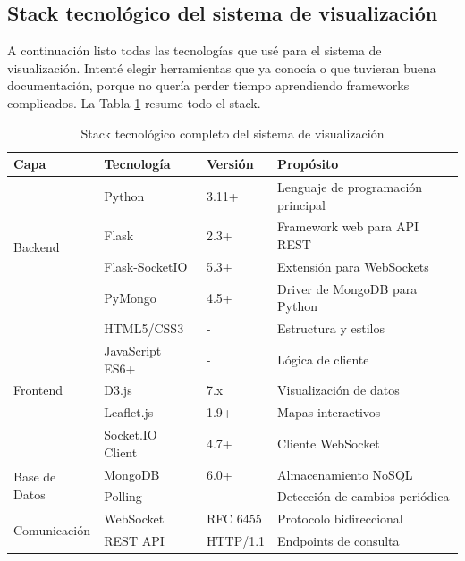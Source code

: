\documentclass[12pt,a4paper]{article}
\begin{document}
\subsection{Stack tecnológico del sistema de visualización}\label{stack-tecnologico-completo}

A continuación listo todas las tecnologías que usé para el sistema de visualización. Intenté elegir herramientas que ya conocía o que tuvieran buena documentación, porque no quería perder tiempo aprendiendo frameworks complicados. La Tabla \ref{tab:stack-tecnologico} resume todo el stack.

\begin{table}[H]
    \centering
    \caption{Stack tecnológico completo del sistema de visualización}
    \label{tab:stack-tecnologico}
    \begin{tabular}{@{}lllp{5cm}@{}}
        \toprule
        \textbf{Capa} & \textbf{Tecnología} & \textbf{Versión} & \textbf{Propósito}                 \\
        \midrule
        \multirow{4}{*}{Backend}
                      & Python              & 3.11+            & Lenguaje de programación principal \\
                      & Flask               & 2.3+             & Framework web para API REST        \\
                      & Flask-SocketIO      & 5.3+             & Extensión para WebSockets          \\
                      & PyMongo             & 4.5+             & Driver de MongoDB para Python      \\
        \midrule
        \multirow{5}{*}{Frontend}
                      & HTML5/CSS3          & -                & Estructura y estilos               \\
                      & JavaScript ES6+     & -                & Lógica de cliente                  \\
                      & D3.js               & 7.x              & Visualización de datos             \\
                      & Leaflet.js          & 1.9+             & Mapas interactivos                 \\
                      & Socket.IO Client    & 4.7+             & Cliente WebSocket                  \\
        \midrule
        \multirow{2}{*}{Base de Datos}
                      & MongoDB             & 6.0+             & Almacenamiento NoSQL               \\
                      & Polling             & -                & Detección de cambios periódica     \\
        \midrule
        \multirow{2}{*}{Comunicación}
                      & WebSocket           & RFC 6455         & Protocolo bidireccional            \\
                      & REST API            & HTTP/1.1         & Endpoints de consulta              \\
        \bottomrule
    \end{tabular}
\end{table}
\end{document}
